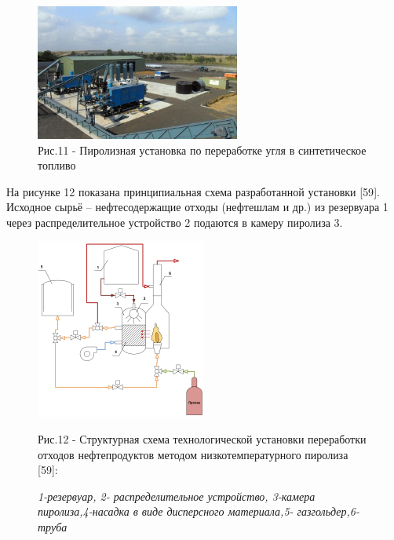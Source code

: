 \begin{figure}[H]
	\centering
	\includegraphics[width=0.6\textwidth]{media/chem2/image74}
	\caption*{Рис.11 - Пиролизная установка по переработке угля в
синтетическое топливо}
\end{figure}

\begin{multicols}{2}
На рисунке 12 показана принципиальная схема разработанной установки
{[}59{]}. Исходное сырьё -- нефтесодержащие отходы (нефтешлам и др.) из
резервуара 1 через распределительное устройство 2 подаются в камеру
пиролиза 3.
\end{multicols}

\begin{figure}[H]
	\centering
	\includegraphics[width=0.5\textwidth]{media/chem2/image75}
	\caption*{Рис.12 - Структурная схема технологической установки
переработки отходов нефтепродуктов методом низкотемпературного пиролиза
{[}59{]}:}
    \caption*{\normalfont\emph{1-резервуар, 2- распределительное устройство, 3-камера пиролиза,4-насадка в виде дисперсного материала,5- газгольдер,6-труба}}
\end{figure}

